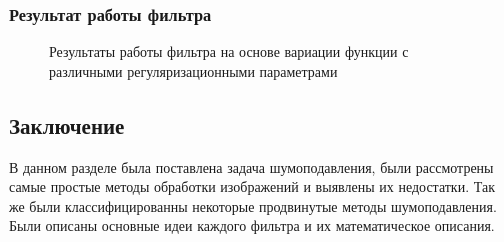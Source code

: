 \subsubsection{Результат работы фильтра}
\begin{figure}[H]\label{img:tv}
	\begin{minipage}[H]{0.49\linewidth}
	\end{minipage}
	\begin{minipage}[H]{0.49\linewidth}
	\end{minipage}
	\caption{Результаты работы фильтра на основе вариации функции с различными регуляризационными параметрами}
\end{figure}

\subsection{Заключение}
В данном разделе была поставлена задача шумоподавления, были рассмотрены самые простые методы обработки изображений и выявлены их недостатки. Так же были классифицированны некоторые продвинутые методы шумоподавления. Были описаны основные идеи каждого фильтра и их математическое описания.
